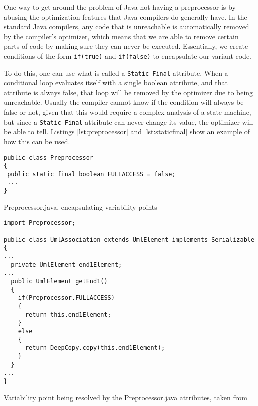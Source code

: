 One way to get around the problem of Java not having a preprocessor is by abusing the optimization features that Java compilers do generally have. In the standard Java compilers, any code that is unreachable is automatically removed by the compiler's optimizer, which means that we are able to remove certain parts of code by making sure they can never be executed. Essentially, we create conditions of the form \lstinline{if(true)} and \lstinline{if(false)} to encapsulate our \gls{variant} code.

To do this, one can use what is called a \lstinline{Static Final} attribute. When a conditional loop evaluates itself with a single boolean attribute, and that attribute is always false, that loop will be removed by the optimizer due to being unreachable. Usually the compiler cannot know if the condition will always be false or not, given that this would require a complex analysis of a state machine, but since a \lstinline{Static Final} attribute can never change its value, the optimizer will be able to tell. Listings \ref{lst:preprocessor} and \ref{lst:staticfinal} show an example of how this can be used.

\begin{listing}
\begin{verbatim}
public class Preprocessor
{
 public static final boolean FULLACCESS = false;
 ...
}
\end{verbatim}
\caption{Preprocessor.java, encapsulating variability points} \label{lst:preprocessor}
\end{listing}

\begin{listing}
\begin{verbatim}
import Preprocessor;

public class UmlAssociation extends UmlElement implements Serializable
{
...
  private UmlElement end1Element;
...
  public UmlElement getEnd1()
  {
    if(Preprocessor.FULLACCESS)
    {
      return this.end1Element;
    }
    else
    {
      return DeepCopy.copy(this.end1Element);
    }
  }
...
}
\end{verbatim}
\caption{Variability point being resolved by the Preprocessor.java attributes, taken from \cite{AUTOREST}} \label{lst:staticfinal}
\end{listing}

